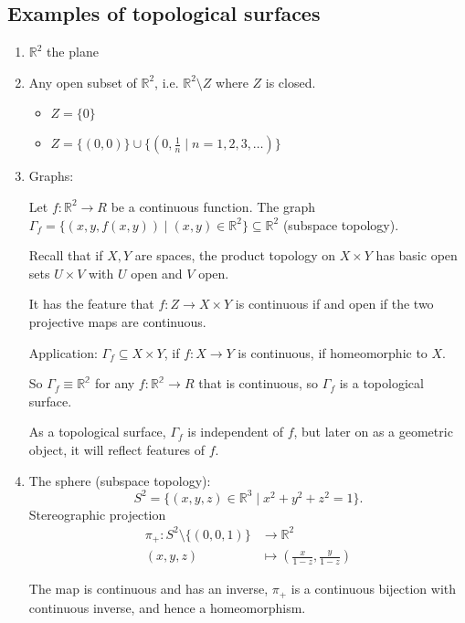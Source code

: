 \subsection{Examples of topological surfaces}
\begin{eg}
    \begin{enumerate}
        \item \(\mathbb{R}^2\) the plane
        \item Any open subset of \(\mathbb{R}^2\), i.e. \(\mathbb{R}^2 \setminus Z\) where \(Z\) is closed. 
        \begin{itemize}
            \item \(Z = \{0\}\)
            \item \(Z = \{(0,0)\}\cup \{(0,\frac{1}{n}\mid n = 1,2,3, \ldots )\}\)
        \end{itemize}
        \item Graphs:

        Let \(f: \mathbb{R}^2 \to R\) be a continuous function. The graph \(\Gamma_f = \{(x,y,f(x, y))\mid (x,y) \in \mathbb{R}^2\} \subseteq \mathbb{R}^2\) (subspace topology).

        Recall that if \(X, Y\) are spaces, the product topology on \(X \times Y\) has basic open sets \(U \times V\) with \(U\) open and \(V\) open.

        It has the feature that \(f: Z \to  X \times Y\) is continuous if and open if the two projective maps are continuous.

        Application: \(\Gamma_f \subseteq X \times Y \), if \(f: X \to Y\) is continuous, if homeomorphic to \(X\).

        So \(\Gamma_f \equiv \mathbb{R^2}\) for any \(f: \mathbb{R^2} \to  R\) that is continuous, so \(\Gamma_f\) is a topological surface.

        \begin{note}
            As a topological surface, \(\Gamma_f\) is independent of \(f\), but later on as a geometric object, it will reflect features of \(f\). 
        \end{note}
        \item The sphere (subspace topology):
        \[
            S^2 = \{(x,y,z) \in \mathbb{R}^3 \mid x^2 + y^2 + z^2 = 1\}.
        \]
        Stereographic projection
        \begin{align*}
            \pi_+: S^2 \setminus \{(0,0,1)\} &\to \mathbb{R}^2\\
            (x,y,z) &\mapsto (\frac{x}{1-z}, \frac{y}{1 - z})
        \end{align*}
        \begin{note}
            The map is continuous and has an inverse,
            \(\pi_+\) is a continuous bijection with continuous inverse, and hence a homeomorphism.


\end{note}
\end{enumerate}
\end{eg}

